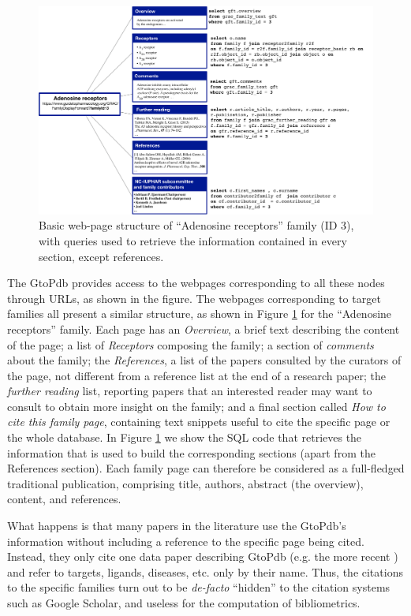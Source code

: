 \begin{figure}[]
\centering
  \includegraphics[width=1\textwidth]{figures/family_structure}
  \caption{Basic web-page structure of ``Adenosine receptors'' family (ID 3), with queries used to retrieve the information contained in every section, except references.}
  \label{figure:family_structure}
\end{figure}


The GtoPdb provides access to the webpages corresponding to all these nodes through URLs, as shown in the figure. 
The webpages corresponding to target families all present a similar structure, as shown in Figure \ref{figure:family_structure} for the ``Adenosine receptors'' family. 
Each page has an \emph{Overview}, a brief text describing the content of the page; a list of \emph{Receptors} composing the family; a section of \emph{comments} about the family;
the \emph{References}, a list of the papers consulted by the curators of the page, not different from a reference list at the end of a research paper;
the \emph{further reading} list, reporting papers that an interested reader may want to consult to obtain more insight on the family; and a final section called \emph{How to cite this family page}, containing text snippets useful to cite the specific page or the whole database. 
In Figure \ref{figure:family_structure} we show the SQL code that retrieves the information that is used to build the corresponding sections (apart from the References section).
Each family page can therefore be considered as a full-fledged traditional publication, comprising title, authors, abstract (the overview), content, and references. 

What happens is that many papers in the literature use the GtoPdb's information without including a reference to the specific page being cited. 
Instead, they only cite one data paper describing GtoPdb (e.g. the more recent \citep{iuphar2018}) and refer to targets, ligands, diseases, etc. only by their name. 
Thus, the citations to the specific families turn out to be \emph{de-facto} ``hidden'' to the citation systems such as Google Scholar, and useless for the computation of bibliometrics. 

